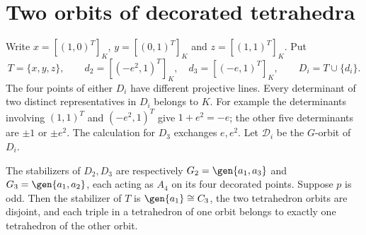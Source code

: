 \section{Two orbits of decorated tetrahedra}

Write $x=[(1,0)^T]_K$, $y=[(0,1)^T]_K$ and $z=[(1,1)^T]_K$.
Put
\[
 T=\{x,y,z\},\qquad d_2=[(-e^2,1)^T]_K,\quad
 d_3=[(-e,1)^T]_K,\qquad D_i=T\cup\{d_i\}.
\]
The four points of either $D_i$ have different projective lines.
Every determinant of two distinct representatives in $D_i$ belongs
to $K$. For example the determinants involving $(1,1)^T$ and
$(-e^2,1)^T$ give $1+e^2=-e$; the other five determinants are
$\pm1$ or $\pm e^2$. The calculation for $D_3$ exchanges $e,e^2$.
Let $\mathcal D_i$ be the $G$-orbit of $D_i$.

\begin{lemma}\label{tetra-stabilizers}
The stabilizers of $D_2,D_3$ are respectively
$G_2=\gen{a_1,a_3}$ and $G_3=\gen{a_1,a_2}$, each acting as
$A_4$ on its four decorated points. Suppose $p$ is odd.
Then the stabilizer of $T$ is $\gen{a_1}\cong C_3$,
the two tetrahedron orbits are disjoint, and each triple in a
tetrahedron of one orbit belongs to exactly one tetrahedron of
the other orbit.
\end{lemma}
